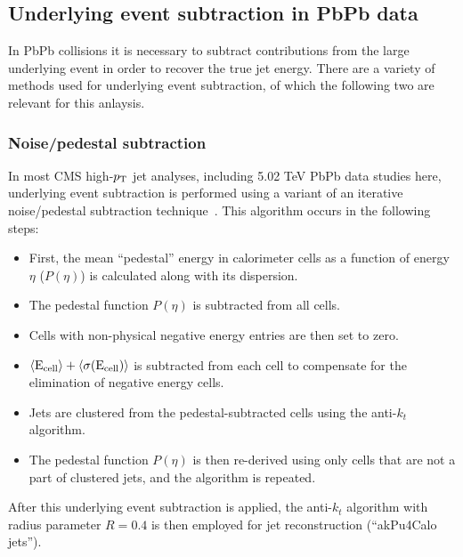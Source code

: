  
\subsection{Underlying event subtraction in PbPb data}

In PbPb collisions it is necessary to subtract contributions from the large underlying event in order to recover the true jet energy.  There are a variety of methods used for underlying event subtraction, of which the following two are relevant for this anlaysis.  

\subsubsection{Noise/pedestal subtraction}
 In most CMS high-$p_{\rm T}$ jet analyses, including 5.02 TeV PbPb data studies here, underlying event subtraction is performed using a variant of an iterative noise/pedestal subtraction technique~\cite{Kodolova:2007hd}.  This algorithm occurs in the following steps: 
 \begin{itemize}
 \item First, the mean ``pedestal'' energy in calorimeter cells as a function of energy $\eta$ ($P(\eta)$) is calculated along with its dispersion.  
 \item The pedestal function $P(\eta)$ is subtracted from all cells.  
 \item Cells with non-physical negative energy entries are then set to zero.
 \item $ \langle{\rm E_{cell}}\rangle + \langle\sigma (\rm E_{cell})\rangle$ is subtracted from each cell to compensate for the elimination of negative energy cells.
 \item Jets are clustered from the pedestal-subtracted cells using the anti-$k_{t}$ algorithm.  
 \item The pedestal function $P(\eta)$ is then re-derived using only cells that are not a part of clustered jets, and the algorithm is repeated.  
 \end{itemize}
 
 \noindent  After this underlying event subtraction is applied, the anti-$k_{t}$ algorithm with radius parameter $R = 0.4$ is then employed for jet reconstruction (``akPu4Calo jets'').  

